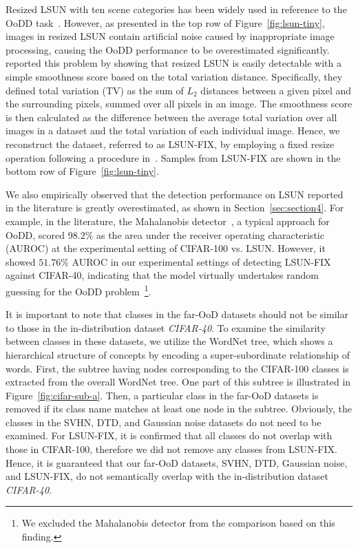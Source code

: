 \documentclass[preprint,12pt]{elsarticle}
\begin{document}
Resized LSUN with ten scene categories has been widely used in reference to the OoDD task~\citep{liang2017enhancing, lee2018simple}. However, as presented in the top row of Figure~\ref{fig:lsun-tiny}, images in resized LSUN contain artificial noise caused by inappropriate image processing, causing the OoDD performance to be overestimated significantly. \cite{tack2020csi} reported this problem by showing that resized LSUN is easily detectable with a simple smoothness score based on the total variation distance. Specifically, they defined total variation (TV) as the sum of $L_2$ distances between a given pixel and the surrounding pixels, summed over all pixels in an image. The smoothness score is then calculated as the difference between the average total variation over all images in a dataset and the total variation of each individual image. Hence, we reconstruct the dataset, referred to as LSUN-FIX, by employing a fixed resize operation following a procedure in~\cite{tack2020csi}. Samples from LSUN-FIX are shown in the bottom row of Figure~\ref{fig:lsun-tiny}.

We also empirically observed that the detection performance on LSUN reported in the literature is greatly overestimated, as shown in Section~\ref{sec:section4}. For example, in the literature, the Mahalanobis detector~\citep{lee2018simple}, a typical approach for OoDD, scored $98.2\%$ as the area under the receiver operating characteristic (AUROC) at the experimental setting of CIFAR-100 vs. LSUN. However, it showed $51.76\%$ AUROC in our experimental settings of detecting LSUN-FIX against CIFAR-40, indicating that the model virtually undertakes random guessing for the OoDD problem~\footnote{We excluded the Mahalanobis detector from the comparison based on this finding.}.

It is important to note that classes in the far-OoD datasets should not be similar to those in the in-distribution dataset \emph{CIFAR-40}. To examine the similarity between classes in these datasets, we utilize the WordNet tree, which shows a hierarchical structure of concepts by encoding a super-subordinate relationship of words.
First, the subtree having nodes corresponding to the CIFAR-100 classes is extracted from the overall WordNet tree. One part of this subtree is illustrated in Figure~\ref{fig:cifar-sub-a}. Then, a particular class in the far-OoD datasets is removed if its class name matches at least one node in the subtree. Obviously, the classes in the SVHN, DTD, and Gaussian noise datasets do not need to be examined. For LSUN-FIX, it is confirmed that all classes do not overlap with those in CIFAR-100, therefore we did not remove any classes from LSUN-FIX. Hence, it is guaranteed that our far-OoD datasets, SVHN, DTD, Gaussian noise, and LSUN-FIX, do not semantically overlap with the in-distribution dataset \emph{CIFAR-40}.
\end{document}
